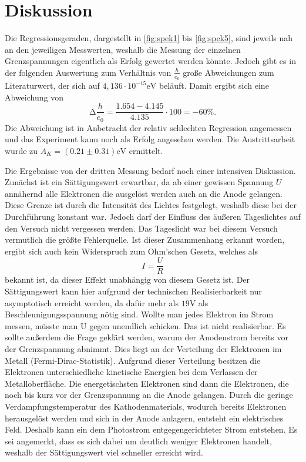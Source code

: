 \section{Diskussion}
\label{sec:Diskussion}

Die Regressionsgeraden, dargestellt in \autoref{fig:spek1} bis \autoref{fig:spek5}, sind jeweils
nah an den jeweiligen Messwerten, weshalb die Messung der einzelnen Grenzspannungen eigentlich als Erfolg gewertet werden könnte.
Jedoch gibt es in der folgenden Auswertung zum Verhältnis von $\frac{h}{e_0}$ große Abweichungen zum Literaturwert,
der sich auf $4,136 \cdot 10^{-15} \unit\eV$ beläuft.
Damit ergibt sich eine Abweichung von 
\begin{equation*}
    \increment \frac{h}{e_0} = \frac{1.654  - 4.145}{4.135} \cdot 100 = -60 \%.
\end{equation*}
Die Abweichung ist in Anbetracht der relativ schlechten Regression angemessen und das Experiment kann
noch als Erfolg angesehen werden.
Die Austrittsarbeit wurde zu $A_K = (0.21 ±  0.31) \unit{\eV}$ ermittelt.

Die Ergebnisse von der dritten Messung bedarf noch einer intensiven Diskussion.
Zunächst ist ein Sättigungswert erwartbar, da ab einer gewissen Spannung $U$ annähernd alle
Elektronen die ausgelöst werden auch an die Anode gelangen.
Diese Grenze ist durch die Intensität des Lichtes festgelegt, weshalb diese bei der Durchführung 
konstant war. Jedoch darf der Einfluss des äußeren Tageslichtes auf den Versuch nicht vergessen werden.
Das Tageslicht war bei diesem Versuch vermutlich die größte Fehlerquelle.
Ist dieser Zusammenhang erkannt worden, ergibt sich auch kein Widerspruch zum Ohm'schen
Gesetz, welches als
\begin{equation*}
    I = \frac{U}{R}
\end{equation*}
bekannt ist, da dieser Effekt unabhängig von diesem Gesetz ist.
Der Sättigungswert kann hier aufgrund der technischen Realisierbarkeit nur asymptotisch erreicht werden,
da dafür mehr als $19 \unit\volt$ als Beschleunigungsspannung nötig sind.
Wollte man jedes Elektron im Strom messen, müsste man U gegen unendlich schicken.
Das ist nicht realisierbar.
Es sollte außerdem die Frage geklärt werden, warum der Anodenstrom bereits vor der
Grenzspannung abnimmt. Dies liegt an der Verteilung der Elektronen im Metall (Fermi-Dirac-Statistik).
Aufgrund dieser Verteilung besitzen die Elektronen unterschiedliche kinetische Energien bei
dem Verlassen der Metalloberfläche. Die energetischsten Elektronen sind dann die Elektronen, die noch bis kurz
vor der Grenzspannung an die Anode gelangen.
Durch die geringe Verdampfungstemperatur des Kathodenmaterials, wodurch bereits Elektronen herausgelöst werden und sich in der Anode anlagern,
entsteht ein elektrisches Feld.
Deshalb kann ein dem Photostrom entgegengerichteter Strom entstehen.
Es sei angemerkt, dass es sich dabei um deutlich weniger Elektronen handelt, weshalb der Sättigungswert viel schneller erreicht wird.

